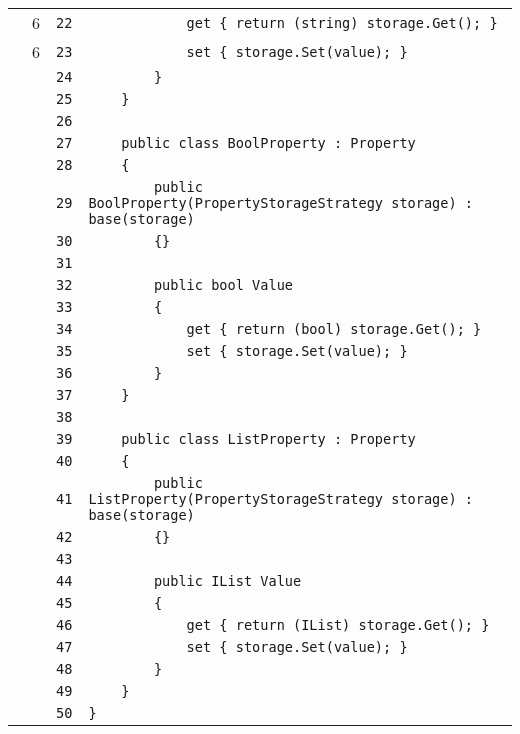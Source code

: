 \documentclass[a4paper,10pt]{article}
\begin{document}
\begin{longtable}[l]{lrrl}
\cellcolor{green} & 6 & \verb~22~ & \verb~            get { return (string) storage.Get(); }~\\
\cellcolor{green} & 6 & \verb~23~ & \verb~            set { storage.Set(value); }~\\
\cellcolor{gray} &  & \verb~24~ & \verb~        }~\\
\cellcolor{gray} &  & \verb~25~ & \verb~    }~\\
\cellcolor{gray} &  & \verb~26~ & \verb~~\\
\cellcolor{gray} &  & \verb~27~ & \verb~    public class BoolProperty : Property~\\
\cellcolor{gray} &  & \verb~28~ & \verb~    {~\\
\cellcolor{gray} &  & \verb~29~ & \verb~        public BoolProperty(PropertyStorageStrategy storage) : base(storage)~\\
\cellcolor{gray} &  & \verb~30~ & \verb~        {}~\\
\cellcolor{gray} &  & \verb~31~ & \verb~~\\
\cellcolor{gray} &  & \verb~32~ & \verb~        public bool Value~\\
\cellcolor{gray} &  & \verb~33~ & \verb~        {~\\
\cellcolor{gray} &  & \verb~34~ & \verb~            get { return (bool) storage.Get(); }~\\
\cellcolor{gray} &  & \verb~35~ & \verb~            set { storage.Set(value); }~\\
\cellcolor{gray} &  & \verb~36~ & \verb~        }~\\
\cellcolor{gray} &  & \verb~37~ & \verb~    }~\\
\cellcolor{gray} &  & \verb~38~ & \verb~~\\
\cellcolor{gray} &  & \verb~39~ & \verb~    public class ListProperty : Property~\\
\cellcolor{gray} &  & \verb~40~ & \verb~    {~\\
\cellcolor{gray} &  & \verb~41~ & \verb~        public ListProperty(PropertyStorageStrategy storage) : base(storage)~\\
\cellcolor{gray} &  & \verb~42~ & \verb~        {}~\\
\cellcolor{gray} &  & \verb~43~ & \verb~~\\
\cellcolor{gray} &  & \verb~44~ & \verb~        public IList Value~\\
\cellcolor{gray} &  & \verb~45~ & \verb~        {~\\
\cellcolor{gray} &  & \verb~46~ & \verb~            get { return (IList) storage.Get(); }~\\
\cellcolor{gray} &  & \verb~47~ & \verb~            set { storage.Set(value); }~\\
\cellcolor{gray} &  & \verb~48~ & \verb~        }~\\
\cellcolor{gray} &  & \verb~49~ & \verb~    }~\\
\cellcolor{gray} &  & \verb~50~ & \verb~}~\\
\end{longtable}
\newpage
\end{document}
